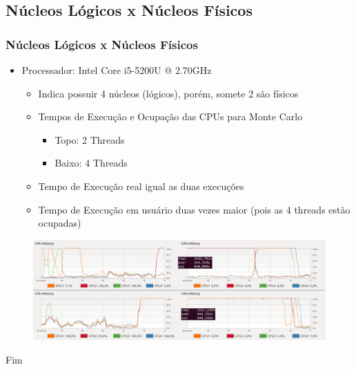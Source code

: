 \documentclass{beamer}
\begin{document}
\begin{frame}

\section{Núcleos Lógicos x Núcleos Físicos}
\frametitle{Núcleos Lógicos x Núcleos Físicos}
	
\begin{itemize}
    \item Processador: Intel Core i5-5200U @ 2.70GHz
    \begin{itemize}
		\item Indica possuir 4 núcleos (lógicos), porém, somete 2 são físicos
		\item Tempos de Execução e Ocupação das CPUs para Monte Carlo
		\begin{itemize}
			\item Topo: 2 Threads
			\item Baixo: 4 Threads
		\end{itemize}
		\item Tempo de Execução real igual as duas execuções
		\item Tempo de Execução em usuário duas vezes maior (pois as 4 threads estão ocupadas)
	\end{itemize}

\end{itemize}

\begin{figure}
	\includegraphics[width=\linewidth]{fig02.png}
\end{figure}

\end{frame}


\begin{frame}
\Huge{\centerline{Fim}}
\end{frame}

\end{document}
